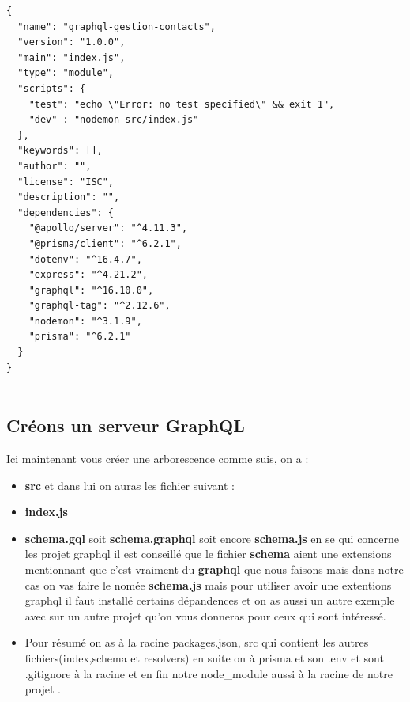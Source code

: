 \documentclass[a4paper,12pt]{article}
\begin{document}
\begin{verbatim}
{
  "name": "graphql-gestion-contacts",
  "version": "1.0.0",
  "main": "index.js",
  "type": "module",
  "scripts": {
    "test": "echo \"Error: no test specified\" && exit 1",
    "dev" : "nodemon src/index.js"
  },
  "keywords": [],
  "author": "",
  "license": "ISC",
  "description": "",
  "dependencies": {
    "@apollo/server": "^4.11.3",
    "@prisma/client": "^6.2.1",
    "dotenv": "^16.4.7",
    "express": "^4.21.2",
    "graphql": "^16.10.0",
    "graphql-tag": "^2.12.6",
    "nodemon": "^3.1.9",
    "prisma": "^6.2.1"
  }
}


\end{verbatim}


\subsection{Créons un serveur GraphQL}

Ici maintenant vous créer une arborescence comme suis, on a :

\begin{itemize}
    \item \textbf{src} et dans lui on auras les fichier suivant : 
    
    \item \textbf{index.js}
    \item \textbf{schema.gql} soit \textbf{schema.graphql} soit encore \textbf{schema.js} en se qui concerne les projet graphql il est conseillé que le fichier \textbf{schema} aient une extensions mentionnant que c'est vraiment du \textbf{graphql} que nous faisons mais dans notre cas on vas faire le nomée \textbf{schema.js} mais pour utiliser avoir une extentions graphql il faut installé certains dépandences et on as aussi un autre exemple avec sur un autre projet qu'on vous donneras pour ceux qui sont intéressé.
    \item Pour résumé on as à la racine packages.json, src qui contient les autres fichiers(index,schema et resolvers) en suite on à prisma et son .env et sont .gitignore à la racine et en fin notre node\_module aussi à la racine de notre projet .
\end{itemize}
\end{document}
